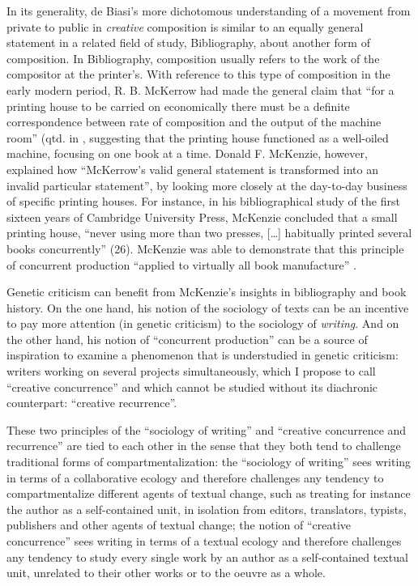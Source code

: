 \begin{paper}
In its generality, de Biasi's more dichotomous understanding of a
movement from private to public in \emph{creative} composition is
similar to an equally general statement in a related field of study,
Bibliography, about another form of composition. In Bibliography,
composition usually refers to the work of the compositor at the
printer's. With reference to this type of composition in the early
modern period, R. B. McKerrow had made the general claim that ``for a
printing house to be carried on economically there must be a definite
correspondence between rate of composition and the output of the machine
room'' (qtd. in \citealt[26]{mckenzie_making_2002}, suggesting that the printing house
functioned as a well-oiled machine, focusing on one book at a time.
Donald F. McKenzie, however, explained how ``McKerrow's valid general
statement is transformed into an invalid particular statement'', by
looking more closely at the day-to-day business of specific printing
houses. For instance, in his bibliographical study of the first sixteen
years of Cambridge University Press, McKenzie concluded that a small
printing house, ``never using more than two presses, {[}\ldots{}{]} habitually printed several books concurrently'' (26). McKenzie was able
to demonstrate that this principle of concurrent production ``applied to
virtually all book manufacture'' \citep[McDonald and Suarez in][14]{mckenzie_making_2002}.

Genetic criticism can benefit from McKenzie's insights in bibliography
and book history. On the one hand, his notion of the sociology of texts
can be an incentive to pay more attention (in genetic criticism) to the
sociology of \emph{writing}. And on the other hand, his notion of
``concurrent production'' can be a source of inspiration to examine a
phenomenon that is understudied in genetic criticism: writers working on
several projects simultaneously, which I propose to call ``creative
concurrence'' and which cannot be studied without its diachronic
counterpart: ``creative recurrence''.

These two principles of the ``sociology of writing'' and ``creative
concurrence and recurrence'' are tied to each other in the sense that
they both tend to challenge traditional forms of compartmentalization:
the ``sociology of writing'' sees writing in terms of a collaborative
ecology and therefore challenges any tendency to compartmentalize
different agents of textual change, such as treating for instance the
author as a self-contained unit, in isolation from editors, translators,
typists, publishers and other agents of textual change; the notion of
``creative concurrence'' sees writing in terms of a textual ecology and
therefore challenges any tendency to study every single work by an
author as a self-contained textual unit, unrelated to their other works
or to the oeuvre as a whole.


\end{paper}

